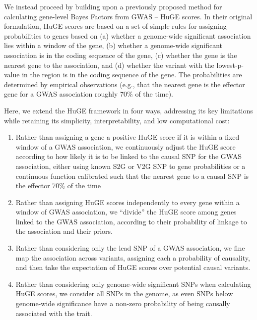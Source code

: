 We instead proceed by building upon a previously proposed method
for calculating gene-level Bayes Factors from GWAS -- HuGE scores\cite{}. In
their original formulation, HuGE scores are based on a set of simple
rules for assigning probabilities to genes based on (a) whether a
genome-wide significant association lies within a window of the gene,
(b) whether a genome-wide significant association is in the coding
sequence of the gene, (c) whether the gene is the nearest gene to the
association, and (d) whether the variant with the lowest-p-value in
the region is in the coding sequence of the gene. The probabilities
are determined by empirical observations (e.g., that the nearest gene
is the effector gene for a GWAS association roughly 70\% of the time\cite{}).

Here, we extend the HuGE framework in four ways, addressing its key
limitations while retaining its simplicity, interpretability, and low
computational cost:
\begin{enumerate}
\item Rather than assigning a gene a positive HuGE score if it is within
a fixed window of a GWAS association, we continuously adjust the HuGE
score according to how likely it is to be linked to the causal SNP for
the GWAS association, either using known S2G\cite{} or V2G\cite{} SNP
to gene probabilities or a continuous function calibrated such that
the nearest gene to a causal SNP is the effector 70\% of the time\cite{}
\item Rather than assigning HuGE scores independently to every gene within a window of GWAS
  association, we ``divide'' the HuGE score among genes linked to the
  GWAS association, according to their probability of linkage to the
  association and their priors.
\item Rather than considering only the lead SNP of a GWAS association,
  we fine map the association across variants, assigning each a
  probability of causality, and then take the expectation of HuGE
  scores over potential causal variants.
\item Rather than considering only genome-wide significant SNPs when
  calculating HuGE scores, we consider all SNPs in the genome, as even
  SNPs below genome-wide significance have a non-zero probability of
  being causally associated with the trait.
\end{enumerate}

